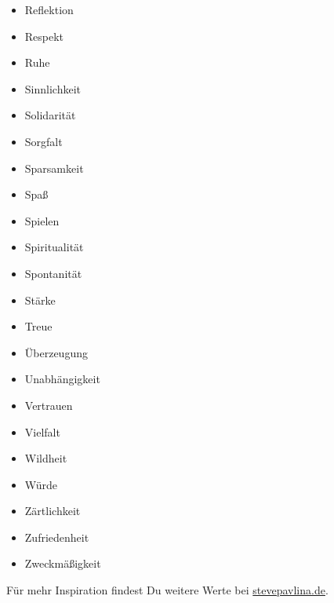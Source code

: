 \documentclass[../Lebensziel.tex]{subfiles}
\begin{document}
\begin{multicols}{3}
\begin{itemize}
        \item Reflektion
        \item Respekt
        \item Ruhe
        \item Sinnlichkeit
        \item Solidarität
        \item Sorgfalt
        \item Sparsamkeit
        \item Spaß
        \item Spielen
        \item Spiritualität
        \item Spontanität
        \item Stärke
        \item Treue
        \item Überzeugung
        \item Unabhängigkeit
        \item Vertrauen
        \item Vielfalt
        \item Wildheit
        \item Würde
        \item Zärtlichkeit
        \item Zufriedenheit
        \item Zweckmäßigkeit
    \end{itemize}
\end{multicols}

Für mehr Inspiration findest Du weitere Werte bei \href{https://stevepavlina.de/werte-liste/}{stevepavlina.de}.
\end{document}
